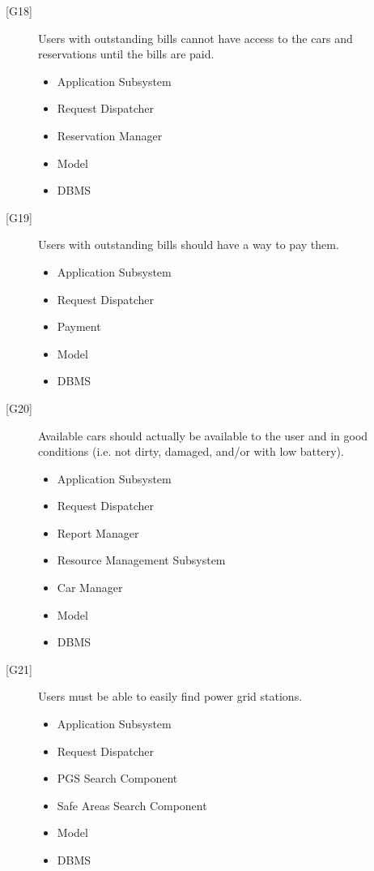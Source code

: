 \documentclass[english]{article}
\begin{document}
\begin{description}
\begin{itemize}
	\end{itemize}
	\item[{[G18]}]{Users with outstanding bills cannot have access to the cars and reservations until the bills are paid.}
	\begin{itemize}
		\item{Application Subsystem}
		\item{Request Dispatcher}
		\item{Reservation Manager}
		\item{Model}
		\item{DBMS}
	\end{itemize}
	\item[{[G19]}]{Users with outstanding bills should have a way to pay them.}
	\begin{itemize}
		\item{Application Subsystem}
		\item{Request Dispatcher}
		\item{Payment}
		\item{Model}
		\item{DBMS}
	\end{itemize}
	\item[{[G20]}]{Available cars should actually be available to the user and in good conditions (i.e. not dirty, damaged, and/or with low battery).}
	\begin{itemize}
		\item{Application Subsystem}
		\item{Request Dispatcher}
		\item{Report Manager}
		\item{Resource Management Subsystem}
		\item{Car Manager}
		\item{Model}
		\item{DBMS}
	\end{itemize}
	\item[{[G21]}]{Users must be able to easily find power grid stations.}
	\begin{itemize}
		\item{Application Subsystem}
		\item{Request Dispatcher}
		\item{PGS Search Component}
		\item{Safe Areas Search Component}
		\item{Model}
		\item{DBMS}
	\end{itemize}

\end{description}
\end{document}

